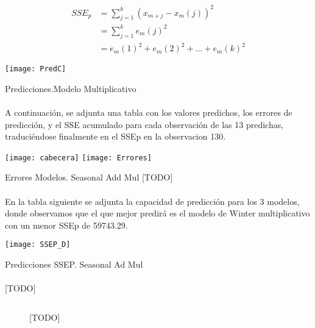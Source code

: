 \documentclass[a4paper, spanish]{article}
\begin{document}
    \begin{align*}
      SSE_p
      &= \sum_{j = 1} ^ k (x_{m + j} - x_{m}(j)) ^ 2 \\
      &= \sum_{j = 1} ^ k e_m(j) ^ 2 \\
      &= e_m(1) ^ 2 + e_m(2) ^ 2 + ... + e_m(k) ^ 2
    \end{align*}

    \begin{table}[htb!]
      \centering
      \texttt{[image: PredC]}
      \caption{Predicciones.Modelo Multiplicativo}
      \label{}
    \end{table}

    \paragraph{}
    A continuación, se adjunta una tabla con los valores predichos, los errores de predicción, y el SSE acumulado para cada observación de las 13 predichas, traduciéndose finalmente en el SSEp en la observacion 130.

    \begin{table}[htb!]
      \centering
      \texttt{[image: cabecera]}
      \texttt{[image: Errores]}
      \caption{Errores Modelos. Seasonal Add Mul [TODO]}
      \label{}
    \end{table}

    \paragraph{}
    En la tabla siguiente se adjunta la capacidad de predicción para los 3 modelos, donde observamos que el que mejor predirá
    es el modelo de Winter multiplicativo con un menor SSEp de 59743.29.

    \begin{table}[htb!]
      \centering
      \texttt{[image: SSEP\_D]}
      \caption{Predicciones SSEP. Seasonal Ad Mul}
      \label{}
    \end{table}

    \paragraph{}
    [TODO]

    \begin{figure}[htb!]
      \centering
      \inputminted{SAS}{./res/code/d-01-cross-validation.sas}
      \caption{[TODO]}
      \label{code:d_cross_validation}
    \end{figure}
\end{document}
